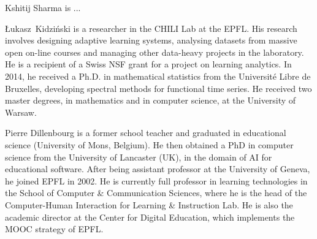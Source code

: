 \documentclass[10pt,journal,compsoc]{IEEEtran}
\begin{document}
\begin{IEEEbiography}{Kshitij Sharma}
 is ...
\end{IEEEbiography}

\begin{IEEEbiography}{{\L}ukasz~Kidzi\'nski}
 is a researcher in the CHILI Lab at the EPFL. His research involves designing adaptive learning systems, analysing datasets from massive open on-line courses and managing other data-heavy projects in the laboratory. He is a recipient of a Swiss NSF grant for a project on learning analytics. In 2014, he received a Ph.D. in mathematical statistics from the Universit\'e Libre de Bruxelles, developing spectral methods for functional time series. He received two master degrees, in mathematics and in computer science, at the University of Warsaw.
\end{IEEEbiography}


\begin{IEEEbiography}{Pierre Dillenbourg} is a former school teacher and graduated in educational science (University of Mons, Belgium). He then obtained a PhD in computer science from the University of Lancaster (UK), in the domain of AI for educational software. After being assistant professor at the University of Geneva, he joined EPFL in 2002. He is currently full professor in learning technologies in the School of Computer \& Communication Sciences, where he is the head of the Computer-Human Interaction for Learning \& Instruction Lab. He is also the academic director at the Center for Digital Education, which implements the MOOC strategy of EPFL.
\end{IEEEbiography}
\end{document}
